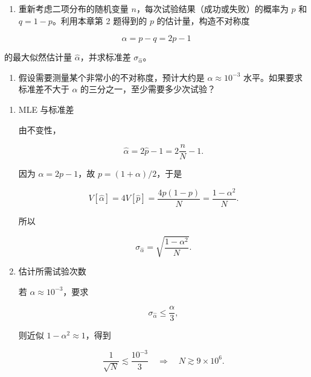 \begin{question}
\begin{enumerate}
\item
  重新考虑二项分布的随机变量 \(n\)，每次试验结果（成功或失败）的概率为
  \(p\) 和 \(q=1-p\)。利用本章第 2 题得到的 \(p\) 的估计量，构造不对称度
\end{enumerate}

\[
\alpha=p-q=2p-1
\]

的最大似然估计量 \(\hat\alpha\)，并求标准差 \(\sigma_{\hat\alpha}\)。

\begin{enumerate}[start=2]
\item
  假设需要测量某个非常小的不对称度，预计大约是 \(\alpha\approx10^{-3}\)
  水平。如果要求标准差不大于 \(\alpha\) 的三分之一，至少需要多少次试验？
\end{enumerate}
\begin{solution}
\begin{enumerate}
\item MLE 与标准差

由不变性，

\[
\hat\alpha=2\hat p-1=2\frac nN-1.
\]

因为 \(\alpha=2p-1\)，故 \(p=(1+\alpha)/2\)，于是

\[
V[\hat\alpha]=4V[\hat p]=\frac{4p(1-p)}{N}=\frac{1-\alpha^2}{N}.
\]

所以

\[
\sigma_{\hat\alpha}=\sqrt{\frac{1-\alpha^2}{N}}.
\]

\item 估计所需试验次数

若 \(\alpha\approx10^{-3}\)，要求

\[
\sigma_{\hat\alpha}\le \frac\alpha3,
\]

则近似 \(1-\alpha^2\approx1\)，得到

\[
\frac1{\sqrt N}\lesssim\frac{10^{-3}}3
\quad\Rightarrow\quad
N\gtrsim9\times10^6.
\]
\end{enumerate}
\end{solution}
\end{question}



